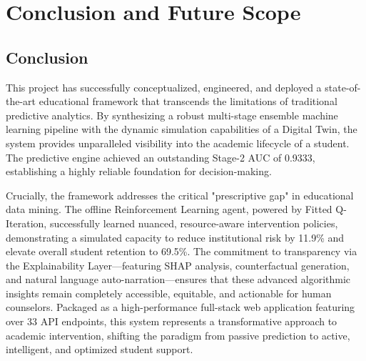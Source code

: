 \documentclass[12pt,a4paper]{report}
\begin{document}
\chapter{Conclusion and Future Scope}

\section{Conclusion}
This project has successfully conceptualized, engineered, and deployed a state-of-the-art educational framework that transcends the limitations of traditional predictive analytics. By synthesizing a robust multi-stage ensemble machine learning pipeline with the dynamic simulation capabilities of a Digital Twin, the system provides unparalleled visibility into the academic lifecycle of a student. The predictive engine achieved an outstanding Stage-2 AUC of 0.9333, establishing a highly reliable foundation for decision-making. 

Crucially, the framework addresses the critical "prescriptive gap" in educational data mining. The offline Reinforcement Learning agent, powered by Fitted Q-Iteration, successfully learned nuanced, resource-aware intervention policies, demonstrating a simulated capacity to reduce institutional risk by 11.9\% and elevate overall student retention to 69.5\%. The commitment to transparency via the Explainability Layer—featuring SHAP analysis, counterfactual generation, and natural language auto-narration—ensures that these advanced algorithmic insights remain completely accessible, equitable, and actionable for human counselors. Packaged as a high-performance full-stack web application featuring over 33 API endpoints, this system represents a transformative approach to academic intervention, shifting the paradigm from passive prediction to active, intelligent, and optimized student support.
\end{document}
